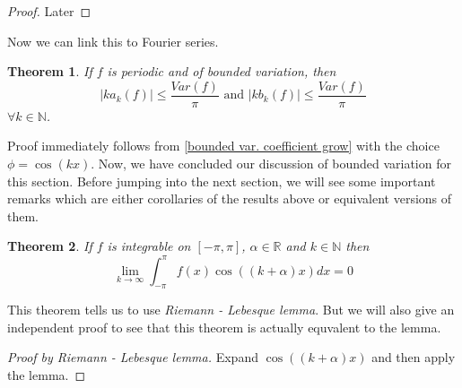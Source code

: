 \documentclass[12pt]{amsart}
\newtheorem{theorem}{Theorem}[section]
\theoremstyle{definition}
\newcommand{\NN}{{\mathbb N}} %
\newcommand{\RR}{{\mathbb R}} %
\begin{document}
\begin{proof}
    Later
\end{proof}


Now we can link this to Fourier series.
\begin{theorem}\label{growth of ceof. of bdd. var.}
    If $f$ is periodic and of bounded variation, then
    \[
    |ka_k(f)|\leq \frac{Var(f)}{\pi}  \text{ and }  |kb_k(f)| \leq \frac{Var(f)}{\pi}
    \]
    $\forall k \in \NN$.
\end{theorem}


Proof immediately follows from \ref{bounded var. coefficient grow} with the choice $\phi = \cos(kx)$. Now, we have concluded our discussion of bounded variation for this section. Before jumping into the next section, we will see some important remarks which are either corollaries of the results above or equivalent versions of them.


\begin{theorem}\label{alternative riemann-lebesque lemma}
    If $f$ is integrable on $[-\pi, \pi]$, $\alpha \in \RR$ and $k \in \NN$ then
    \[
    \lim_{k \to \infty}\int_{-\pi}^{\pi}f(x)\cos((k+\alpha)x) dx = 0
    \]
\end{theorem}


This theorem tells us to use \emph{Riemann - Lebesque lemma}. But we will also give an independent proof to see that this theorem is actually equvalent to the lemma.


\begin{proof}[Proof by \textit{Riemann - Lebesque lemma}]
    Expand $\cos((k+\alpha)x)$ and then apply the lemma.
\end{proof}
\end{document}
